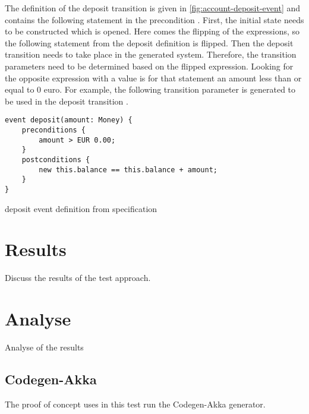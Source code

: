 The definition of the deposit transition is given in
\autoref{fig:account-deposit-event} and contains the following statement in the
precondition . First, the initial state needs to be
constructed which is opened. Here comes the flipping of the expressions, so the
following statement from the deposit definition  is
flipped. Then the deposit transition needs to take place in the generated
system. Therefore, the transition parameters need to be determined based on the
flipped expression. Looking for the opposite expression with a value is for that
statement an amount less than or equal to 0 euro. For example, the following
transition parameter is generated to be used in the deposit transition
.

\begin{sourcecode}[h!]
\begin{lstlisting}[]
event deposit(amount: Money) {
	preconditions {
		amount > EUR 0.00;
	}
	postconditions {
		new this.balance == this.balance + amount;
	}
}
\end{lstlisting}
\caption{deposit event definition from specification}
\label{fig:account-deposit-event}
\end{sourcecode}

\section{Results}
Discuss the results of the test approach.

\section{Analyse}
Analyse of the results

\subsection{Codegen-Akka}
The proof of concept uses in this test run the Codegen-Akka generator.

